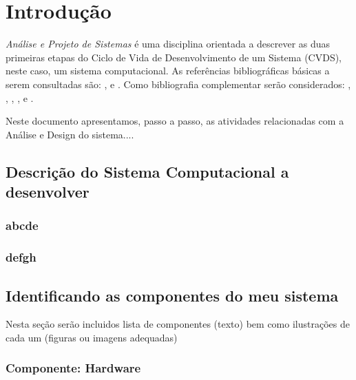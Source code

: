 

\chapter{ Introdu\c{c}\~{a}o}

\textit{An\'{a}lise e Projeto de Sistemas} \'{e} uma disciplina orientada a descrever as duas primeiras etapas do Ciclo de Vida de Desenvolvimento de um Sistema (CVDS), neste caso, um sistema computacional.  As refer\^{e}ncias bibliogr\'{a}ficas b\'{a}sicas a serem consultadas s\~{a}o: \cite{Dennis2014}, \cite{Dennis2019} \cite{Gane1983} e \cite{Sommerville2011}. Como bibliografia complementar ser\~{a}o considerados: \cite{Satzinger2012}, \cite{Shelly2012}, \cite{Valacich2020}, \cite{Kendall2020}, \cite{Budgen2021} e \cite{Engholm2013}.

Neste documento apresentamos, passo a passo,  as atividades relacionadas com a An\'{a}lise e Design do sistema....


 \section{Descri\c{c}\~{a}o do Sistema Computacional a desenvolver}

        \subsection{abcde} 


        \subsection{defgh}

 \section{Identificando as componentes do meu sistema}

      Nesta se\c{c}\~{a}o ser\~{a}o incluidos lista de componentes (texto) bem como ilustra\c{c}\~{o}es de cada um (figuras ou imagens adequadas)
     \subsection{Componente: Hardware}


